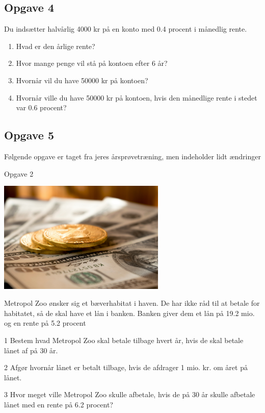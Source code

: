 \subsection*{Opgave 4}

Du indsætter halvårlig 4000 kr på en konto med 0.4 procent i månedlig rente.
\begin{enumerate}[label= \roman*) ]
	\item Hvad er den årlige rente?
	\item Hvor mange penge vil stå på kontoen efter 6 år?
	\item Hvornår vil du have 50000 kr på kontoen?
	\item Hvornår ville du have 50000 kr på kontoen, hvis den månedlige rente i stedet var 0.6 procent?
\end{enumerate}


\subsection*{Opgave 5}

Følgende opgave er taget fra jeres årsprøvetræning, men indeholder lidt ændringer
\begin{opgavetekst}{Opgave 2}
	\begin{center}
		\includegraphics[width=0.6\textwidth]{Billeder/penge}
	\end{center}
	Metropol Zoo ønsker sig et bæverhabitat i haven. De har ikke råd til 
	at betale for habitatet, så de skal have et lån i banken. Banken giver dem et lån på 19.2 mio. og en rente på 5.2 procent
\end{opgavetekst}

\begin{delopgave}{}{1}
	Bestem hvad Metropol Zoo skal betale tilbage hvert år, hvis de 
	skal betale lånet af på 30 år.
\end{delopgave}
\begin{delopgave}{}{2}
	Afgør hvornår lånet er betalt tilbage, hvis de afdrager 1 mio. kr. om året på lånet. 
\end{delopgave}
\begin{delopgave}{}{3}
	Hvor meget ville Metropol Zoo skulle afbetale, hvis de på 30 år skulle afbetale lånet med en rente på 6.2 procent?
\end{delopgave}



